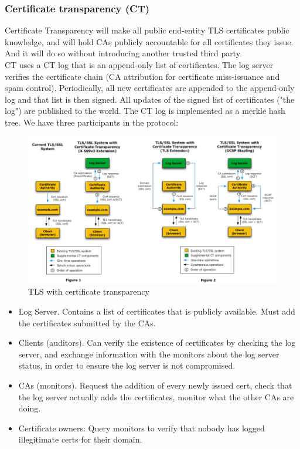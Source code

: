 \documentclass[11pt,oneside,a4paper]{article}
\begin{document}
\newpage

\subsubsection{Certificate transparency (CT)}

Certificate	Transparency will make all public end-entity TLS certificates public knowledge,	and	will hold CAs publicly accountable for all certificates they issue. And it will do so without introducing another trusted third party.\\
\noindent CT uses a CT log that is an append-only list of certificates. The log server verifies the certificate chain (CA attribution for certificate miss-issuance and spam control). Periodically, all new certificates are appended to the append-only log and that list is then signed. All updates of the signed list of certificates ("the log") are published to the world. The CT log is implemented as a merkle hash tree. We have three participants in the protocol:

\begin{figure}
	\centering
	\includegraphics[width=0.9\linewidth]{figures/tls_with_ct}
	\caption{TLS with certificate transparency}
	\label{fig:tlswithct}
\end{figure}


\vspace{-\topsep}
\begin{itemize}
	\setlength{\itemsep}{0pt}
	\setlength{\parskip}{0pt}
	\item Log Server. Contains a list of certificates that is publicly available. Must
	add the certificates submitted by the CAs.
	\item Clients (auditors). Can verify the existence of certificates by checking the log server,
	and exchange information with the monitors about the log server status, in order to
	ensure the log server is not compromised.
	\item CAs (monitors). Request the addition of every newly issued cert, check that the log
	server actually adds the certificates, monitor what the other CAs are doing.
	\item Certificate owners: Query monitors to verify that nobody has logged illegitimate certs for their domain.
\end{itemize}
\vspace{-\topsep}
\end{document}
